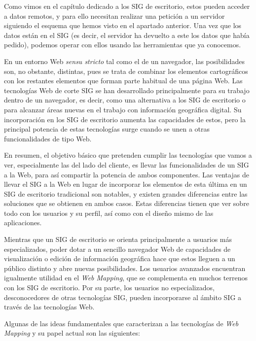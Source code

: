 Como vimos en el capítulo dedicado a los SIG de escritorio, estos pueden acceder a datos remotos, y para ello necesitan realizar una petición a un servidor siguiendo el esquema que hemos visto en el apartado anterior. Una vez que los datos están en el SIG (es decir, el servidor ha devuelto a este los datos que había pedido), podemos operar con ellos usando las herramientas que ya conocemos.

En un entorno Web \emph{sensu stricto} tal como el de un navegador, las posibilidades son, no obstante, distintas, pues se trata de combinar los elementos cartográficos con los restantes elementos que forman parte habitual de una página Web. Las tecnologías Web de corte SIG se han desarrollado principalmente para su trabajo dentro de un navegador, es decir, como una alternativa a los SIG de escritorio o para alcanzar áreas nuevas en el trabajo con información geográfica digital. Su incorporación en los SIG de escritorio aumenta las capacidades de estos, pero la principal potencia de estas tecnologías surge cuando se unen a otras funcionalidades de tipo Web.

En resumen, el objetivo básico que pretenden cumplir las tecnologías que vamos a ver, especialmente las del lado del cliente, es llevar las funcionalidades de un SIG a la Web, para así compartir la potencia de ambos componentes.  Las ventajas de llevar el SIG a la Web en lugar de incorporar los elementos de esta última en un SIG de escritorio tradicional son notables, y existen grandes diferencias entre las soluciones que se obtienen en ambos casos. Estas diferencias tienen que ver sobre todo con los usuarios y su perfil, así como con el diseño mismo de las aplicaciones. 

Mientras que un SIG de escritorio se orienta principalmente a usuarios más especializados, poder dotar a un sencillo navegador Web de capacidades de visualización o edición de información geográfica hace que estos lleguen a un público distinto y abre nuevas posibilidades. Los usuarios avanzados encuentran igualmente utilidad en el \emph{Web Mapping}, que se complementa en muchos terrenos con los SIG de escritorio. Por su parte, los usuarios no especializados, desconocedores de otras tecnologías SIG, pueden incorporarse al ámbito SIG a través de las tecnologías Web.

Algunas de las ideas fundamentales que caracterizan a las tecnologías de \emph{Web Mapping} y su papel actual son las siguientes:

